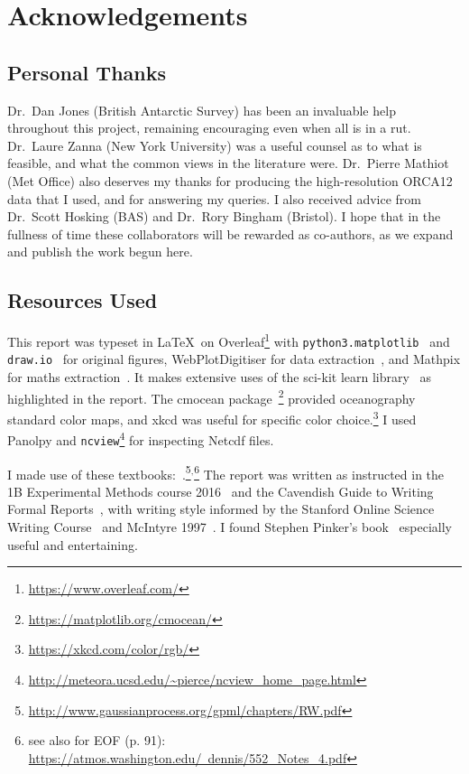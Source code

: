 \documentclass[../main.tex]{subfiles}
\begin{document}
\section{Acknowledgements}
\subsection{Personal Thanks}
Dr.\ Dan Jones (British Antarctic Survey) has been an invaluable help throughout this project,
remaining encouraging even when all is in a rut.
Dr.\ Laure Zanna (New York University) was a useful counsel as to what is feasible,
 and what the common views in the literature were.
Dr.\ Pierre Mathiot (Met Office) also deserves my thanks for
producing the high-resolution ORCA12 data that I used, and
for answering my queries.
I also received advice from Dr.\ Scott Hosking (BAS) and  Dr.\ Rory Bingham (Bristol).
I hope that in the fullness of time these collaborators will be rewarded
as co-authors, as we expand and publish the
work begun here.


\subsection{Resources Used}

This report was typeset in \LaTeX\  on Overleaf\footnote{\href{https://www.overleaf.com/}{https://www.overleaf.com/}}
with \texttt{python3.matplotlib}~\cite{Hunter:2007} and \texttt{draw.io}~\cite{DrawIO}
for original figures, WebPlotDigitiser for data extraction~\cite{WebPlotDigitiser},
and Mathpix for maths extraction~\cite{mathpix}.
It makes extensive uses of the sci-kit learn library~\cite{scikit-learn} as highlighted in the report.
The cmocean package~\cite{thyng2016true}\footnote{\href{https://matplotlib.org/cmocean/}{https://matplotlib.org/cmocean/}}
provided oceanography standard color maps, and xkcd was useful for specific color choice.\footnote{\href{https://xkcd.com/color/rgb/}{https://xkcd.com/color/rgb/}}
I used Panolpy and \texttt{ncview}\footnote{\url{http://meteora.ucsd.edu/~pierce/ncview_home_page.html}}
for inspecting Netcdf files.

I made use of these textbooks:~\cite{roisin2010GFD,williams2011ocean,ITILA,
sivia2006data,landau1959course,faber1995fluid,williams2006gaussian,murphy2012machine}.\footnote{\href{http://www.gaussianprocess.org/gpml/chapters/RW.pdf}{http://www.gaussianprocess.org/gpml/chapters/RW.pdf}}$^{,}$\footnote{see also for EOF (p. 91): \href{https://atmos.washington.edu/~dennis/552_Notes_4.pdf}{https://atmos.washington.edu/~dennis/552\_Notes\_4.pdf}}
The report was written as instructed in the 1B Experimental Methods course
2016~\cite{presentation} and the Cavendish Guide to Writing Formal
Reports~\cite{LabNotes}, with writing style informed
by the Stanford Online Science Writing Course~\cite{ScienceWriting}
and McIntyre 1997~\cite{mcintyre1997lucidity}.
I found Stephen Pinker's book~\cite{pinker2015sense} especially useful and entertaining.
\end{document}
